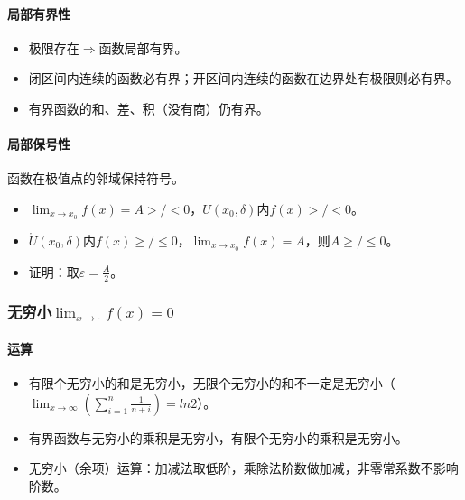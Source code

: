 \documentclass[
12pt, %
a4paper, 
oneside, %
headinclude,footinclude, %
]{scrartcl}
\begin{document}
\paragraph{局部有界性}
\begin{itemize}
\item 极限存在$ \Rightarrow $函数局部有界。
\item 闭区间内连续的函数必有界；开区间内连续的函数在边界处有极限则必有界。
\item 有界函数的和、差、积（没有商）仍有界。
\end{itemize}
\paragraph{局部保号性}
函数在极值点的邻域保持符号。
\begin{itemize}
\item $ \lim_{x \to x_0} f(x) = A >/< 0 $，$ U(x_0, \delta) $内$ f(x) >/< 0 $。
\item $ \mathring{U}(x_0, \delta) $内$ f(x) \geq /\leq 0$，$ \lim_{x \to x_0} f(x) = A $，则$ A \geq / \leq 0 $。
\item 证明：取$ \varepsilon = \frac{A}{2} $。
\end{itemize}
\subsubsection[无穷小]{无穷小$ \lim_{x \to \cdot} f(x) = 0 $}
\paragraph{运算}
\begin{itemize}
\item 有限个无穷小的和是无穷小，无限个无穷小的和不一定是无穷小（$ \lim_{x \to \infty}(\sum_{i = 1}^{n}  \frac{1}{n + i}) = ln 2 $）。
\item 有界函数与无穷小的乘积是无穷小，有限个无穷小的乘积是无穷小。
\item 无穷小（余项）运算：加减法取低阶，乘除法阶数做加减，非零常系数不影响阶数。
\end{itemize}
\end{document}
